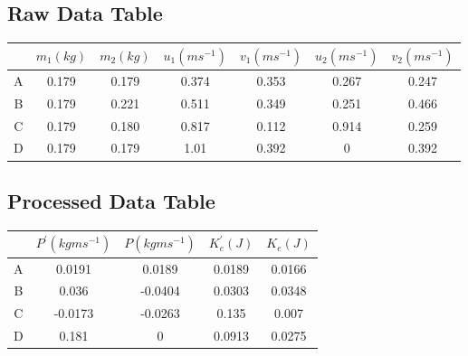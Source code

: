 \documentclass[12pt,a4paper]{article}
\begin{document}
\begin{spacing}{1.25}
\subsection{Raw Data Table}
\begin{table}[!ht]
    \centering
    \begin{tabular}{|c|c|c|c|c|c|c|}
    \hline
          & $ m_{1}(kg) $& $ m_{2}(kg) $ & $ u_1(ms^{-1}) $ & $ v_{1}(ms^{-1}) $ & $ u_2(ms^{-1}) $ & $ v_{2}(ms^{-1}) $  \\ \hline
        A & 0.179 & 0.179 & 0.374 & 0.353 & 0.267 & 0.247  \\ 
        B & 0.179 & 0.221 & 0.511 & 0.349 & 0.251 & 0.466  \\ 
        C & 0.179 & 0.180 & 0.817 & 0.112 & 0.914 & 0.259  \\ 
        D & 0.179 & 0.179 & 1.01 & 0.392 & 0 & 0.392 \\ \hline
    \end{tabular}
\end{table}
\subsection{Processed Data Table}
\begin{table}[!ht]
    \centering
    \begin{tabular}{|c|c|c|c|c|}
    \hline
        ~ & $ P^{\prime}(kgms^{-1}) $ & $ P(kgms^{-1}) $ & $ K_e^{\prime}(J) $ & $ K_e(J) $  \\ \hline
        A & 0.0191 & 0.0189 & 0.0189 & 0.0166 \\ 
        B & 0.036 & -0.0404 & 0.0303 & 0.0348 \\ 
        C & -0.0173 & -0.0263 & 0.135 & 0.007 \\ 
        D & 0.181 & 0 & 0.0913 & 0.0275 \\ \hline
    \end{tabular}
\end{table}
\end{spacing}
\end{document}
